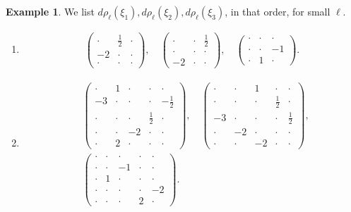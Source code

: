 \documentclass[a4paper,10pt,leqno]{article}
\numberwithin{equation}{section}
\theoremstyle{plain}
\theoremstyle{definition}
\newtheorem{ex}[thm]{Example}
\theoremstyle{remark}
\newcommand{\mat}[1]{\begin{matrix}#1\end{matrix}}
\newcommand{\pmat}[1]{\left(\mat{#1}\right)}
\begin{document}
\begin{ex}\label{ex:d-rho-xi}
We list $d\rho_\ell(\xi_1), d\rho_\ell(\xi_2), d\rho_\ell(\xi_3)$, in that order, for small $\ell$.
\begin{enumerate} 
\item[$\ell = 1$:]
\begin{align}
\pmat{\cdot&\frac{1}{2}&\cdot\\ 
	-2&\cdot&\cdot\\ 
	\cdot&\cdot&\cdot},\quad 
\pmat{\cdot&\cdot&\frac{1}{2}\\ 
	\cdot&\cdot&\cdot\\ 
	-2&\cdot&\cdot},\quad 
\pmat{\cdot&\cdot&\cdot\\ 
	\cdot&\cdot&-1\\ 
	\cdot&1&\cdot}.
\end{align}

\item[$\ell = 2$:]
\begin{align}
&\pmat{\cdot&1&\cdot&\cdot&\cdot\\
	-3&\cdot&\cdot&\cdot&-\frac{1}{2}\\
	\cdot&\cdot&\cdot&\frac{1}{2}&\cdot\\ 
	\cdot&\cdot&-2&\cdot&\cdot\\ 
	\cdot&2&\cdot&\cdot&\cdot},\quad 
\pmat{\cdot&\cdot&1&\cdot&\cdot\\
	\cdot&\cdot&\cdot&\frac{1}{2}&\cdot\\
	-3&\cdot&\cdot&\cdot&\frac{1}{2}\\ 
	\cdot&-2&\cdot&\cdot&\cdot\\ 
	\cdot&\cdot&-2&\cdot&\cdot},\\[0.5ex]
&\pmat{\cdot&\cdot&\cdot&\cdot&\cdot\\
	\cdot&\cdot&-1&\cdot&\cdot\\
	\cdot&1&\cdot&\cdot&\cdot\\
	\cdot&\cdot&\cdot&\cdot&-2\\
	\cdot&\cdot&\cdot&2&\cdot}.
\end{align}


\end{enumerate}
\end{ex}
\end{document}
